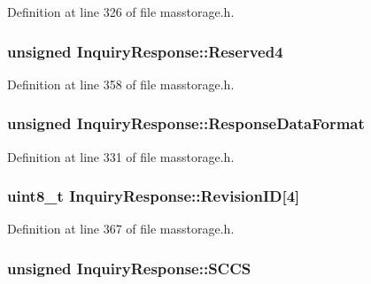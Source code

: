 \-Definition at line 326 of file masstorage.\-h.

\hypertarget{struct_inquiry_response_ae5c315ca0c47104b17d5bde7c4d485a6}{
\subsubsection[{\-Reserved4}]{\setlength{\rightskip}{0pt plus 5cm}unsigned {\bf \-Inquiry\-Response\-::\-Reserved4}}}\label{struct_inquiry_response_ae5c315ca0c47104b17d5bde7c4d485a6}


\-Definition at line 358 of file masstorage.\-h.

\hypertarget{struct_inquiry_response_a801e10546dedbd134568bef84f1b287a}{
\subsubsection[{\-Response\-Data\-Format}]{\setlength{\rightskip}{0pt plus 5cm}unsigned {\bf \-Inquiry\-Response\-::\-Response\-Data\-Format}}}\label{struct_inquiry_response_a801e10546dedbd134568bef84f1b287a}


\-Definition at line 331 of file masstorage.\-h.

\hypertarget{struct_inquiry_response_a23775c8cb582ae07c78449dc1a08c23e}{
\subsubsection[{\-Revision\-I\-D}]{\setlength{\rightskip}{0pt plus 5cm}uint8\-\_\-t {\bf \-Inquiry\-Response\-::\-Revision\-I\-D}\mbox{[}4\mbox{]}}}\label{struct_inquiry_response_a23775c8cb582ae07c78449dc1a08c23e}


\-Definition at line 367 of file masstorage.\-h.

\hypertarget{struct_inquiry_response_a3ed45a85bce19a76850cf5085ab35187}{
\subsubsection[{\-S\-C\-C\-S}]{\setlength{\rightskip}{0pt plus 5cm}unsigned {\bf \-Inquiry\-Response\-::\-S\-C\-C\-S}}}\label{struct_inquiry_response_a3ed45a85bce19a76850cf5085ab35187}


